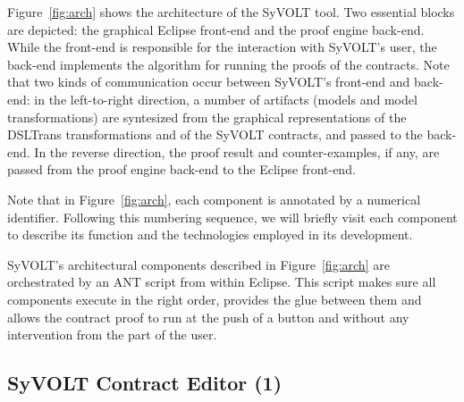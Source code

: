  Figure~\ref{fig:arch} shows the
architecture of the SyVOLT tool. Two essential blocks are depicted: the
graphical Eclipse front-end and the proof engine back-end. While the front-end
is responsible for the interaction with SyVOLT's user, the back-end implements
the algorithm for running the proofs of the contracts. Note that two kinds of
communication occur between SyVOLT's front-end and back-end: in the
left-to-right direction, a number of artifacts (models and model
transformations) are syntesized from the graphical representations of the
DSLTrans transformations and of the SyVOLT contracts, and passed to the
back-end. In the reverse direction, the proof result and counter-examples, if
any, are passed from the proof engine back-end to the Eclipse front-end.

Note that in Figure~\ref{fig:arch}, each component is annotated by a numerical
identifier. Following this numbering sequence, we will briefly visit each
component to describe its function and the technologies employed in its development.

SyVOLT's architectural components described in Figure~\ref{fig:arch} are
orchestrated by an ANT script from within Eclipse. This script makes sure all
components execute in the right order, provides the glue between them and allows
the contract proof to run at the push of a button and without any intervention
from the part of the user.



% 


\subsection{SyVOLT Contract Editor (1)}

